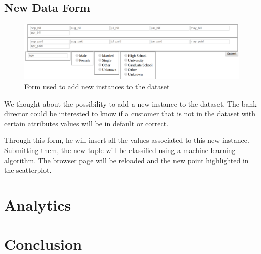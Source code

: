 \documentclass[journal]{vgtc}                %
\begin{document}
\subsection{New Data Form}
\begin{figure}[h]
  \centering
  \includegraphics[scale=0.1]{form}
  \caption{Form used to add new instances to the dataset}
  \label{form}
\end{figure}


We thought about the possibility to add a new instance to the dataset. The bank director could be interested to know if a customer that is not in the dataset with certain attributes values
will be in default or correct.

Through this form, he will insert all the values associated to this new instance. Submitting them, the new tuple will be classified
using a machine learning algorithm. The browser page will be reloaded and the new point highlighted in the scatterplot.

\section{Analytics}





\section{Conclusion}






\end{document}
